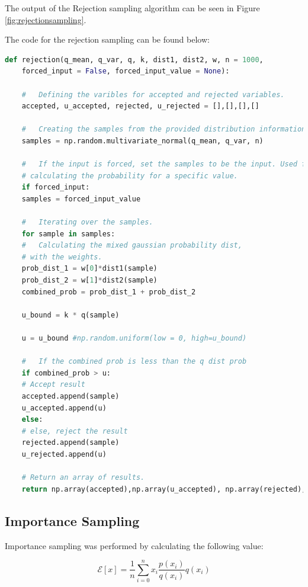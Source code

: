 \documentclass[a4paper, 11pt]{article}
\begin{document}
The output of the Rejection sampling algorithm can be seen in Figure \ref*{fig:rejectionsampling}.



The code for the rejection sampling can be found below:
\begin{lstlisting}[language=Python, caption=Rejection Sampling Code.]
def rejection(q_mean, q_var, q, k, dist1, dist2, w, n = 1000, 
    forced_input = False, forced_input_value = None):

    #   Defining the varibles for accepted and rejected variables.
    accepted, u_accepted, rejected, u_rejected = [],[],[],[] 

    #   Creating the samples from the provided distribution information.
    samples = np.random.multivariate_normal(q_mean, q_var, n)

    #   If the input is forced, set the samples to be the input. Used for 
    # calculating the probability for a specific value.
    if forced_input:
    samples = forced_input_value

    #   Iterating over the samples.
    for sample in samples:
    #   Calculating the mixed gaussian probability dist,
    # with the weights.
    prob_dist_1 = w[0]*dist1(sample)
    prob_dist_2 = w[1]*dist2(sample)
    combined_prob = prob_dist_1 + prob_dist_2

    u_bound = k * q(sample)

    u = u_bound #np.random.uniform(low = 0, high=u_bound)

    #   If the combined prob is less than the q dist prob
    if combined_prob > u:
    # Accept result
    accepted.append(sample)
    u_accepted.append(u)
    else:
    # else, reject the result
    rejected.append(sample)
    u_rejected.append(u)

    # Return an array of results.
    return np.array(accepted),np.array(u_accepted), np.array(rejected), np.array(u_rejected)
\end{lstlisting}

\subsection*{Importance Sampling}

Importance sampling was performed by calculating the following value:

\begin{equation}\label{eq:importance}
        \mathcal{E}[x] = \frac{1}{n} \sum_{i=0}^n x_i \frac{p(x_i)}{q(x_i)} q(x_i)
\end{equation}
\end{document}
